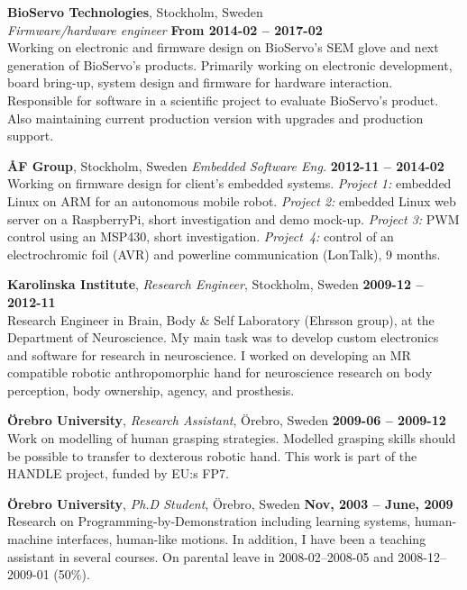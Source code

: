 \documentclass[a4paper,margin,line]{res} \usepackage{latexsym}
\begin{document}
\begin{resume}
{\bf BioServo Technologies}, Stockholm, Sweden\\
{\em Firmware/hardware engineer} \hfill {\bf From 2014-02 --
  2017-02}\\ Working on electronic and firmware design on BioServo's
SEM glove and next generation of BioServo's products.  Primarily
working on electronic development, board bring-up, system design and
firmware for hardware interaction. Responsible for software in a
scientific project to evaluate BioServo's product.  Also maintaining
current production version with upgrades and production support.


{\bf {\AA}F Group}, Stockholm, Sweden
{\em Embedded Software Eng.} \hfill {\bf 2012-11 -- 2014-02}\\ Working
on firmware design for client's embedded systems.  {\em Project 1:}
embedded Linux on ARM for an autonomous mobile robot.  {\em Project
  2:} embedded Linux web server on a RaspberryPi, short investigation
and demo mock-up.  {\em Project 3:} PWM control using an MSP430, short
investigation.  {\em Project~4:} control of an electrochromic foil
(AVR) and powerline communication (LonTalk), 9 months.


{\bf Karolinska Institute}, {\em Research Engineer}, Stockholm, Sweden
\hfill {\bf 2009-12 -- 2012-11}\\ Research Engineer in Brain, Body \&
Self Laboratory (Ehrsson group), at the Department of Neuroscience.
My main task was to develop custom electronics and software for
research in neuroscience.  I worked on developing an MR compatible
robotic anthropomorphic hand for neuroscience research on body
perception, body ownership, agency, and prosthesis.

{\bf \"Orebro University}, {\em Research Assistant}, \"Orebro, Sweden
\hfill {\bf 2009-06 -- 2009-12}\\ Work on modelling of human grasping
strategies. Modelled grasping skills should be possible to transfer to
dexterous robotic hand. This work is part of the HANDLE project,
funded by EU:s FP7.

{\bf \"Orebro University}, {\em Ph.D Student}, \"Orebro, Sweden \hfill
{\bf Nov, 2003 -- June, 2009}\\ Research on
Programming-by-Demonstration including learning systems, human-machine
interfaces, human-like motions.  In addition, I have been a teaching
assistant in several courses.  On parental leave in 2008-02--2008-05
and 2008-12--2009-01 (50\%).


\end{resume}
\end{document}

